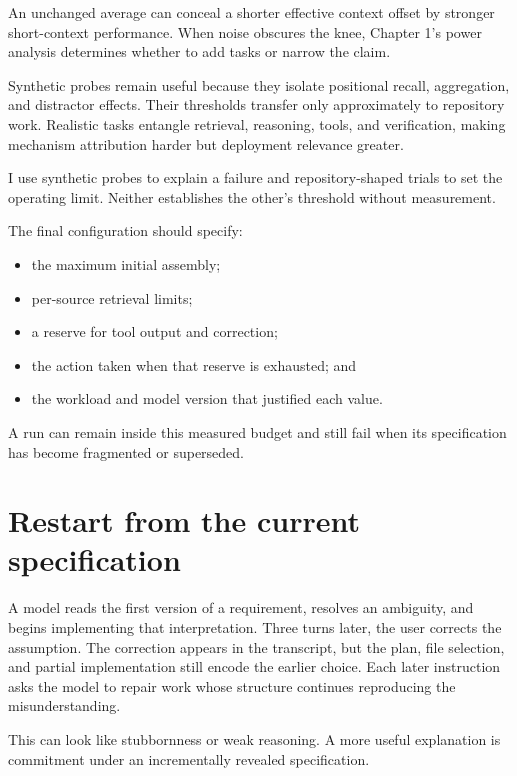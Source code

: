 An unchanged average can conceal a shorter effective context offset by stronger short-context performance. When noise obscures the knee, Chapter 1's power analysis determines whether to add tasks or narrow the claim.

Synthetic probes remain useful because they isolate positional recall, aggregation, and distractor effects. Their thresholds transfer only approximately to repository work. Realistic tasks entangle retrieval, reasoning, tools, and verification, making mechanism attribution harder but deployment relevance greater.

I use synthetic probes to explain a failure and repository-shaped trials to set the operating limit. Neither establishes the other's threshold without measurement.

The final configuration should specify:

\begin{itemize}
\tightlist
\item
  the maximum initial assembly;
\item
  per-source retrieval limits;
\item
  a reserve for tool output and correction;
\item
  the action taken when that reserve is exhausted; and
\item
  the workload and model version that justified each value.
\end{itemize}

A run can remain inside this measured budget and still fail when its specification has become fragmented or superseded.

\section{Restart from the current specification}\label{restart-from-the-current-specification}

A model reads the first version of a requirement, resolves an ambiguity, and begins implementing that interpretation. Three turns later, the user corrects the assumption. The correction appears in the transcript, but the plan, file selection, and partial implementation still encode the earlier choice. Each later instruction asks the model to repair work whose structure continues reproducing the misunderstanding.

This can look like stubbornness or weak reasoning. A more useful explanation is commitment under an incrementally revealed specification.

